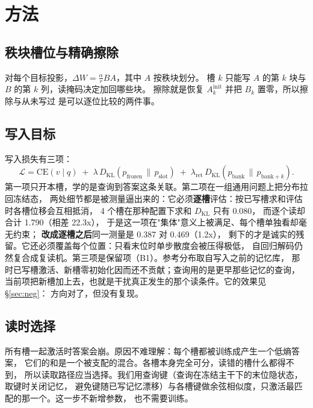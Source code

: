 \documentclass[11pt]{ctexart}
\begin{document}
\section{方法}
\label{sec:method}

\subsection{秩块槽位与精确擦除}


对每个目标投影，$\Delta W = \frac{\alpha}{r} B A$，其中 $A$ 按秩块划分。
槽 $k$ 只能写 $A$ 的第 $k$ 块与 $B$ 的第 $k$ 列，读掩码决定加回哪些块。
擦除就是恢复 $A_k^{\text{init}}$ 并把 $B_k$ 置零，所以擦除与从未写过
是可以逐位比较的两件事。

\subsection{写入目标}
写入损失有三项：
\begin{equation}
\mathcal{L} = \mathrm{CE}(v \mid q)
\; + \; \lambda\, D_{\mathrm{KL}}\!\left(p_{\text{frozen}} \,\|\, p_{\text{slot}}\right)
\; + \; \lambda_{\mathrm{ret}}\, D_{\mathrm{KL}}\!\left(p_{\text{bank}} \,\|\, p_{\text{bank}+k}\right).
\end{equation}
第一项只开本槽，学的是查询到答案这条关联。第二项在一组通用问题上把分布拉回冻结态，
两处细节都是被测量逼出来的：它必须\textbf{逐槽}评估：按已写槽求和评估时各槽位移会互相抵消，
4 个槽在那种配置下求和 $D_{\mathrm{KL}}$ 只有 0.080，
而逐个读却合计 1.790（相差 22.3x），
于是这一项在"集体"意义上被满足、每个槽单独看却毫无约束；
\textbf{改成逐槽之后}同一测量是 0.387 对 0.469（1.2x），
剩下的才是诚实的残留。它还必须覆盖每个位置：只看末位时单步散度会被压得极低，
自回归解码仍然复合成复读机。第三项是保留项（B1）。参考分布取自写入之前的记忆库，
那时已写槽激活、新槽零初始化因而还不贡献；查询用的是更早那些记忆的查询，
当前项把新槽加上去，也就是干扰真正发生的那个读条件。它的效果见 §\ref{sec:neg}：
方向对了，但没有复现。

\subsection{读时选择}
所有槽一起激活时答案会崩。原因不难理解：每个槽都被训练成产生一个低熵答案，
它们的和是一个被支配的混合。各槽本身完全可分，读错的槽什么都得不到，
所以读取路径应当选择。我们用查询键（查询在冻结主干下的末位隐状态，取键时关闭记忆，
避免键随已写记忆漂移）与各槽键做余弦相似度，只激活最匹配的那一个。这一步不新增参数，
也不需要训练。
\end{document}

